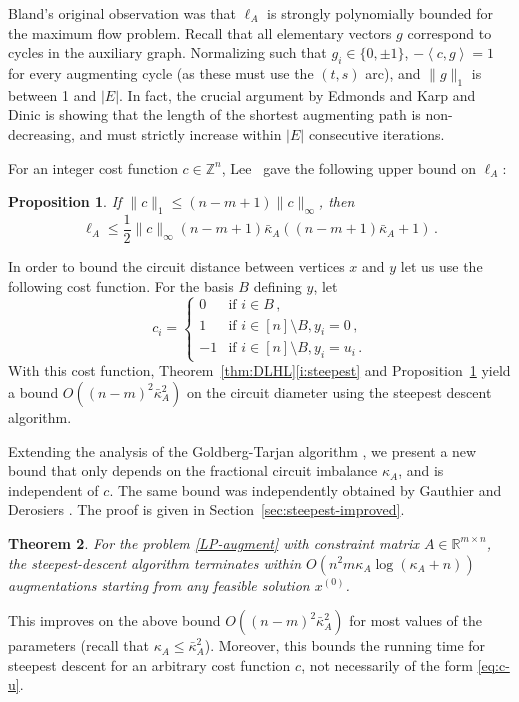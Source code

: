 \documentclass[11pt, a4paper]{article}
\newcommand{\Le}{\kappa}
\newcommand{\pr}[2]{\left\langle #1, #2 \right\rangle}
\newcommand{\1}{\mathbbm{1}}
\newtheorem{theorem}{Theorem}[section]
\newtheorem{prop}[theorem]{Proposition}
\theoremstyle{case}
\newcommand{\R}{\mathbb{R}}
\newcommand{\Z}{\mathbb{Z}}
\begin{document}
Bland's original observation was that $\ell_A$ is strongly polynomially bounded for the maximum flow problem. Recall that all elementary vectors $g$ correspond to cycles in the auxiliary graph. Normalizing such that $g_i\in \{0,\pm 1\}$,  $-\pr{c}{g}=1$ for every augmenting cycle (as these must use the $(t,s)$ arc), and $\|g\|_1$ is between 1 and $|E|$. In fact, the crucial argument by Edmonds and Karp \cite{Edmonds72} and Dinic \cite{dinic1970algorithm}  is showing that the length of the shortest augmenting path is non-decreasing, and must strictly increase within $|E|$ consecutive iterations.

For an integer cost function $c\in \Z^n$, Lee~\cite[Proposition 3.2]{Lee89}  gave the following upper bound on $\ell_A$:
\begin{prop}\label{prop:l-a} If $\|c\|_1\le (n-m+1)\|c\|_\infty$, then 
\[
\ell_A\le\frac12 {\|c\|_\infty} (n-m+1)\bar\Le_A((n-m+1)\bar\Le_A +1)\, .
\]
\end{prop}

 In order to bound the circuit distance between vertices $x$ and $y$ let us use the following cost function. For the basis $B$ defining $y$, let 
\begin{equation}
\label{eq:c-u}
c_i=\begin{cases}0&\mbox{if }i\in B\, ,\\
1& \mbox{if }i\in [n]\setminus B, y_i=0\, ,\\
-1&\mbox{if }i\in [n]\setminus B, y_i=u_i\, .
\end{cases}
\end{equation}
With this cost function, Theorem~\ref{thm:DLHL}\ref{i:steepest} and Proposition~\ref{prop:l-a} yield  a bound $O((n-m)^2 \bar\Le_A^2)$ on the circuit diameter using the steepest descent algorithm.

Extending the analysis of the Goldberg-Tarjan algorithm \cite{Goldberg89}, we present a new bound that only depends on the fractional circuit imbalance $\kappa_A$, and is independent of $c$.
The same bound was independently obtained by Gauthier and Derosiers \cite{Gauthier2021}. The proof is given in Section~\ref{sec:steepest-improved}.

\begin{theorem}\label{thm:steepest-main} For the problem \ref{LP-augment} with constraint matrix $A\in\R^{m\times n}$, the steepest-descent algorithm terminates within $O(n^2m\kappa_A \log(\kappa_A+n))$ augmentations starting from any feasible solution $x^{(0)}$.
\end{theorem} 
This improves on the above bound $O((n-m)^2 \bar\Le_A^2)$ for most values of the parameters (recall that $\kappa_A\le\bar\kappa_A^2$). Moreover, this bounds the running time for steepest descent for an arbitrary cost function $c$, not necessarily of the form \eqref{eq:c-u}.
\end{document}
